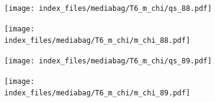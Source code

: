 \documentclass[
  11pt,
  letterpaper,
]{scrreprt}
\begin{document}
\begin{figure}

\begin{minipage}{0.50\linewidth}

\begin{figure}[H]

{\centering \texttt{[image: index\_files/mediabag/T6\_m\_chi/qs\_88.pdf]}

}


\end{figure}%

\end{minipage}%
%
\begin{minipage}{0.50\linewidth}

\begin{figure}[H]

{\centering \texttt{[image: index\_files/mediabag/T6\_m\_chi/m\_chi\_88.pdf]}

}


\end{figure}%

\end{minipage}%

\end{figure}%

\begin{figure}

\begin{minipage}{0.50\linewidth}

\begin{figure}[H]

{\centering \texttt{[image: index\_files/mediabag/T6\_m\_chi/qs\_89.pdf]}

}


\end{figure}%

\end{minipage}%
%
\begin{minipage}{0.50\linewidth}

\begin{figure}[H]

{\centering \texttt{[image: index\_files/mediabag/T6\_m\_chi/m\_chi\_89.pdf]}

}


\end{figure}%

\end{minipage}%

\end{figure}%
\end{document}
